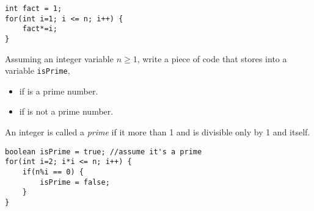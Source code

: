\begin{questions}
\begin{solution}
\begin{lstlisting}
int fact = 1;
for(int i=1; i <= n; i++) {
	fact*=i;	
}
\end{lstlisting}
\end{solution}

\question Assuming an integer variable $n \geq 1$, write a piece of code that stores into a  variable \texttt{isPrime},
	
	\begin{itemize}
	\item {} if  is a prime number.
	\item {} if  is not a prime number.	
	\end{itemize}
	
	An integer is called a \emph{prime} if it more than 1 and is divisible only by 1 and itself.
	
\begin{solution}
\begin{lstlisting}
boolean isPrime = true; //assume it's a prime
for(int i=2; i*i <= n; i++) {
	if(n%i == 0) {
		isPrime = false;
	}
}
\end{lstlisting}
\end{solution}
\end{questions}